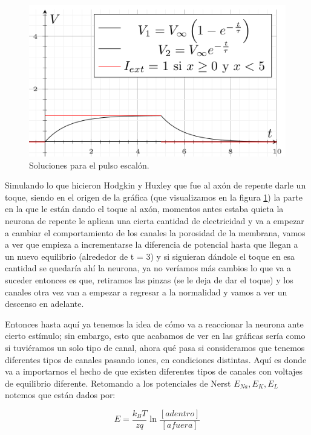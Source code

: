 \begin{figure}[h]
 \centering
 \includegraphics[scale=0.5]{../Figuras/solPulso2.png}
 \caption{Soluciones para el pulso escalón.}
 \label{fig:graficaX1}
\end{figure}

Simulando lo que hicieron Hodgkin y Huxley que fue al axón de repente darle un toque, siendo en el origen de la gráfica (que visualizamos en la figura \ref{fig:graficaX1}) la parte en la que le están dando el toque al axón, momentos antes estaba quieta la neurona de repente le aplican una cierta cantidad de electricidad y va a empezar a cambiar el comportamiento de los canales la porosidad de la membrana, vamos a ver que empieza a incrementarse la diferencia de potencial hasta que llegan a un nuevo equilibrio (alrededor de t = 3) y si siguieran dándole el toque en esa cantidad se quedaría ahí la neurona, ya no veríamos más cambios lo que va a suceder entonces es que, retiramos las pinzas (se le deja de dar el toque) y los canales otra vez van a empezar a regresar a la normalidad y vamos a ver un descenso en adelante.

Entonces hasta aquí ya tenemos la idea de cómo va a reaccionar la neurona ante cierto estímulo; sin embargo, esto que acabamos de ver en las gráficas sería como si tuviéramos un solo tipo de canal, ahora qué pasa si consideramos que tenemos diferentes tipos de canales pasando iones, en condiciones distintas. 
Aquí es donde va a importarnos el hecho de que existen diferentes tipos de canales con voltajes de equilibrio diferente. 
Retomando a los potenciales de Nerst \(E_{Na},E_{K},E_{L}\) notemos que están dados por:


\begin{equation}
    E = \dfrac{k_{B}T}{zq}\ln\dfrac{[adentro]}{[afuera]}
 \label{eq:diferenciaP}
\end{equation}

